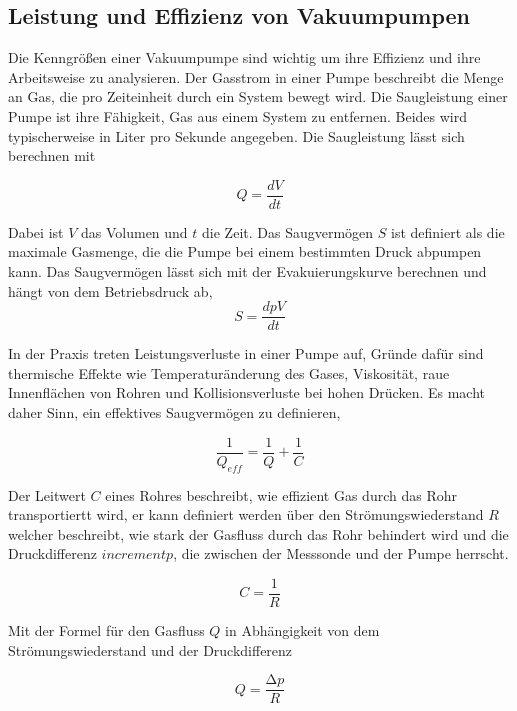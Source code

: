 \subsection{Leistung und Effizienz von Vakuumpumpen}


Die Kenngrößen einer Vakuumpumpe sind wichtig um ihre Effizienz und ihre Arbeitsweise zu analysieren.
Der Gasstrom in einer Pumpe beschreibt die Menge an Gas, die pro Zeiteinheit durch ein System bewegt wird. Die Saugleistung einer Pumpe ist ihre 
Fähigkeit, Gas aus einem System zu entfernen. Beides wird typischerweise in Liter pro Sekunde angegeben. Die Saugleistung lässt sich berechnen mit

\begin{equation}
    Q=\frac{dV}{dt}
\end{equation}

Dabei ist \( V \) das Volumen und \( t \) die Zeit.
Das Saugvermögen $S$ ist definiert als die maximale Gasmenge, die die Pumpe bei einem bestimmten Druck abpumpen kann. Das Saugvermögen lässt sich 
mit der Evakuierungskurve berechnen und hängt von dem Betriebsdruck ab,
\begin{equation}
    S=\frac{dpV}{dt}
\end{equation} 

In der Praxis treten Leistungsverluste in einer Pumpe auf, Gründe dafür sind thermische Effekte wie Temperaturänderung des Gases,
Viskosität, raue Innenflächen von Rohren und Kollisionsverluste bei hohen Drücken. Es macht daher Sinn, ein effektives Saugvermögen zu definieren,

\begin{equation}
    \frac{1}{Q_{eff}}=\frac{1}{Q}+\frac{1}{C}
\end{equation}   

Der Leitwert \( C \) eines Rohres beschreibt, wie effizient Gas durch das Rohr transportiertt wird, er kann definiert werden über 
den Strömungswiederstand \( R \) welcher beschreibt, wie stark der Gasfluss durch das Rohr behindert wird 
und die Druckdifferenz \( increment p\), die zwischen der Messsonde und der Pumpe herrscht. 

\begin{equation}
    C=\frac{1}{R}
\end{equation}

Mit der Formel für den Gasfluss \( Q \) in Abhängigkeit von dem Strömungswiederstand und der Druckdifferenz

\begin{equation}
    Q=\frac{\increment p}{R}
\end{equation}

